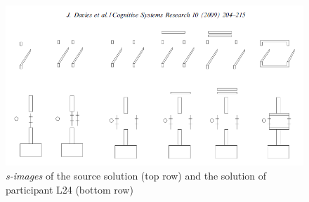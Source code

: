 \documentclass[12pt]{article}
\begin{document}
\begin{figure}[H]
  \centering
  \includegraphics[width=0.7\linewidth]{images/covlan_L24.PNG}
  \caption{\label{fig:covlan_l24}\textit{s-images} of the source solution (top row) and the solution of participant L24 (bottom row)}
\end{figure}  
\end{document}

